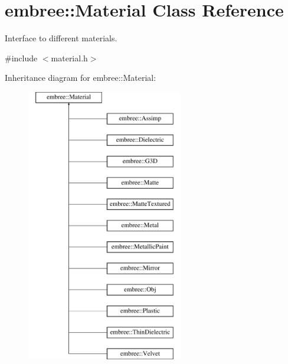 \hypertarget{classembree_1_1_material}{
\section{embree::Material Class Reference}
\label{classembree_1_1_material}
}


Interface to different materials.  




{\ttfamily \#include $<$material.h$>$}

Inheritance diagram for embree::Material:\begin{figure}[H]
\begin{center}
\leavevmode
\includegraphics[height=12.000000cm]{classembree_1_1_material}
\end{center}
\end{figure}
